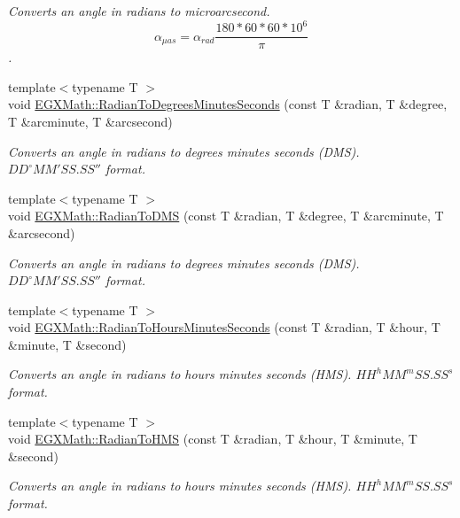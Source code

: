\begin{DoxyCompactItemize}
\begin{DoxyCompactList}\small\item\em Converts an angle in radians to microarcsecond. \[\alpha_{\mu as}=\alpha_{rad}\frac{180 * 60 * 60 * 10^6}{\pi}\]. \end{DoxyCompactList}\item 
{\footnotesize template$<$typename T $>$ }\\void \mbox{\hyperlink{group___e_g_x_math-_angle_conversions-_radian_ga1de6f151aa0950edd2b62ec2449c9361}{E\+G\+X\+Math\+::\+Radian\+To\+Degrees\+Minutes\+Seconds}} (const T \&radian, T \&degree, T \&arcminute, T \&arcsecond)
\begin{DoxyCompactList}\small\item\em Converts an angle in radians to degrees minutes seconds (D\+MS). ${DD}^{\circ}{MM}'{SS.SS}''$ format. \end{DoxyCompactList}\item 
{\footnotesize template$<$typename T $>$ }\\void \mbox{\hyperlink{group___e_g_x_math-_angle_conversions-_radian_gabe3e9aef44d51f0a0bfc33d49ed2483e}{E\+G\+X\+Math\+::\+Radian\+To\+D\+MS}} (const T \&radian, T \&degree, T \&arcminute, T \&arcsecond)
\begin{DoxyCompactList}\small\item\em Converts an angle in radians to degrees minutes seconds (D\+MS). ${DD}^{\circ}{MM}'{SS.SS}''$ format. \end{DoxyCompactList}\item 
{\footnotesize template$<$typename T $>$ }\\void \mbox{\hyperlink{group___e_g_x_math-_angle_conversions-_radian_ga3467598d89af2b8ff68af50b39bb19e2}{E\+G\+X\+Math\+::\+Radian\+To\+Hours\+Minutes\+Seconds}} (const T \&radian, T \&hour, T \&minute, T \&second)
\begin{DoxyCompactList}\small\item\em Converts an angle in radians to hours minutes seconds (H\+MS). ${HH}^h{MM}^m{SS.SS}^s$ format. \end{DoxyCompactList}\item 
{\footnotesize template$<$typename T $>$ }\\void \mbox{\hyperlink{group___e_g_x_math-_angle_conversions-_radian_ga55b5fba9307f34ab8db57391789a90cc}{E\+G\+X\+Math\+::\+Radian\+To\+H\+MS}} (const T \&radian, T \&hour, T \&minute, T \&second)
\begin{DoxyCompactList}\small\item\em Converts an angle in radians to hours minutes seconds (H\+MS). ${HH}^h{MM}^m{SS.SS}^s$ format. \end{DoxyCompactList}\item 

\end{DoxyCompactItemize}
